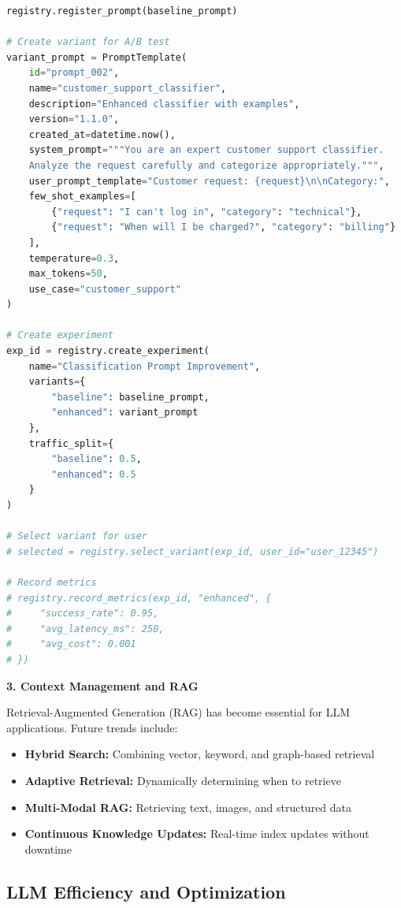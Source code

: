 \begin{lstlisting}[language=Python, caption=LLM Prompt Management System]
registry.register_prompt(baseline_prompt)

# Create variant for A/B test
variant_prompt = PromptTemplate(
    id="prompt_002",
    name="customer_support_classifier",
    description="Enhanced classifier with examples",
    version="1.1.0",
    created_at=datetime.now(),
    system_prompt="""You are an expert customer support classifier.
    Analyze the request carefully and categorize appropriately.""",
    user_prompt_template="Customer request: {request}\n\nCategory:",
    few_shot_examples=[
        {"request": "I can't log in", "category": "technical"},
        {"request": "When will I be charged?", "category": "billing"}
    ],
    temperature=0.3,
    max_tokens=50,
    use_case="customer_support"
)

# Create experiment
exp_id = registry.create_experiment(
    name="Classification Prompt Improvement",
    variants={
        "baseline": baseline_prompt,
        "enhanced": variant_prompt
    },
    traffic_split={
        "baseline": 0.5,
        "enhanced": 0.5
    }
)

# Select variant for user
# selected = registry.select_variant(exp_id, user_id="user_12345")

# Record metrics
# registry.record_metrics(exp_id, "enhanced", {
#     "success_rate": 0.95,
#     "avg_latency_ms": 250,
#     "avg_cost": 0.001
# })
\end{lstlisting}

\textbf{3. Context Management and RAG}

Retrieval-Augmented Generation (RAG) has become essential for LLM applications. Future trends include:

\begin{itemize}
    \item \textbf{Hybrid Search:} Combining vector, keyword, and graph-based retrieval
    \item \textbf{Adaptive Retrieval:} Dynamically determining when to retrieve
    \item \textbf{Multi-Modal RAG:} Retrieving text, images, and structured data
    \item \textbf{Continuous Knowledge Updates:} Real-time index updates without downtime
\end{itemize}

\subsection{LLM Efficiency and Optimization}

